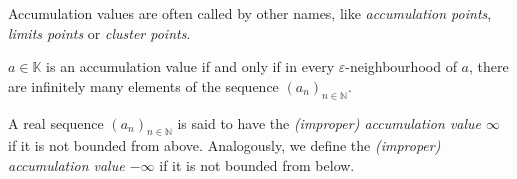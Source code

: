 \begin{Attention}[Names]
Accumulation values are often called by other names, like \emph{accumulation points},
\emph{limits points} or \emph{cluster points}.
\end{Attention}

\begin{Proposition}{}
 $a\in \mathbb{K}$ is an accumulation value if and only if in every $\varepsilon$-neighbourhood of $a$, there are infinitely many elements of the sequence $(a_{n})_{n\in\mathbb{N}}$.
\end{Proposition}

\begin{Definition}\label{accinf}
A real sequence $(a_n)_{n\in\mathbb{N}}$ is said to have the \emph{(improper) accumulation value $\infty$} if it is not bounded from above.
Analogously, we define the \emph{(improper) accumulation value $-\infty$} if it is not bounded from below.
\end{Definition}
